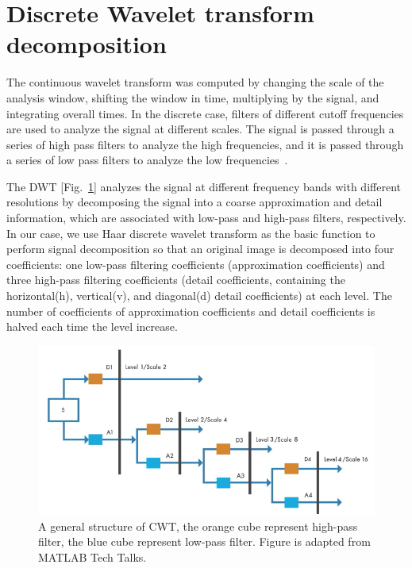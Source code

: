 \section{Discrete Wavelet transform decomposition}

The continuous wavelet transform was computed by changing the scale of the analysis window, shifting the window in time, multiplying by the signal, and integrating overall times. In the discrete case, filters of different cutoff frequencies are used to analyze the signal at different scales. The signal is passed through a series of high pass filters to analyze the high frequencies, and it is passed through a series of low pass filters to analyze the low frequencies~\cite{polikar1996wavelet}.


The DWT [Fig.~\ref{fig:dwt}] analyzes the signal at different frequency bands with different resolutions by decomposing the signal into a coarse approximation and detail information, which are associated with low-pass and high-pass filters, respectively. In our case, we use Haar discrete wavelet transform as the basic function to perform signal decomposition so that an original image is decomposed into four coefficients: one low-pass filtering coefficients (approximation coefficients) and three high-pass filtering coefficients (detail coefficients, containing the horizontal(h), vertical(v), and diagonal(d) detail coefficients) at each level. The number of coefficients of approximation coefficients and detail coefficients is halved each time the level increase.



\begin{figure}[h]
\centering
\includegraphics[width=1\textwidth]{images/dwt.png}
\caption[Structure of CNNs]{A general structure of CWT, the orange cube represent high-pass filter, the blue cube represent low-pass filter. Figure is adapted from MATLAB Tech Talks.}
\label{fig:dwt}
\end{figure}


